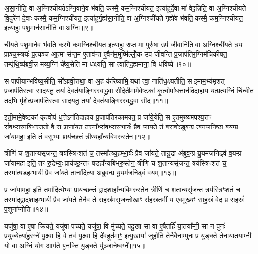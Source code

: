 अ॒सा॒नीति॒ वा अ॒ग्निश्ची॑यते\-ऽग्नि॒वाने॒व भ॑वति॒ कस्मै॒ कम॒ग्निश्ची॑यत॒ इत्या॑हुर्दे॒वा मा॑ वेद॒न्निति॒ वा अ॒ग्निश्ची॑यते वि॒दुरे॑नं दे॒वाः कस्मै॒ कम॒ग्निश्ची॑यत॒ इत्या॑हुर्गृ॒ह्य॑सा॒नीति॒ वा अ॒ग्निश्ची॑यते गृ॒ह्ये॑व भ॑वति॒ कस्मै॒ कम॒ग्निश्ची॑यत॒ इत्या॑हुः पशु॒मान॑सा॒नीति॒ वा अ॒ग्निः॥९॥

ची॒य॒ते॒ प॒शु॒माने॒व भ॑वति॒ कस्मै॒ कम॒ग्निश्ची॑यत॒ इत्या॑हुः स॒प्त मा॒ पुरु॑षा॒ उप॑ जीवा॒निति॒ वा अ॒ग्निश्ची॑यते॒ त्रयः॒ प्राञ्च॒स्त्रयः॑ प्र॒त्यञ्च॑ आ॒त्मा स॑प्त॒म ए॒ताव॑न्त ए॒वैन॑म॒मुष्मि॑ल्लोँ॒क उप॑ जीवन्ति प्र॒जाप॑तिर॒ग्निम॑चिकीषत॒ तम्पृ॑थि॒व्य॑ब्रवी॒न्न मय्य॒ग्निं चे᳚ष्य॒सेति॑ मा धक्ष्यति॒ सा त्वा॑तिद॒ह्यमा॑ना॒ वि ध॑विष्ये॥१०॥

स पापी॑यान्भविष्य॒सीति॒ सो᳚\-ऽब्रवी॒त्तथा॒ वा अ॒हं क॑रिष्यामि॒ यथा᳚ त्वा॒ नाति॑ध॒क्ष्यतीति॒ स इ॒माम॒भ्य॑मृशत् प्र॒जाप॑तिस्त्वा सादयतु॒ तया॑ दे॒वत॑याङ्गिर॒स्वद्ध्रु॒वा सी॒देती॒मामे॒वेष्ट॑कां कृ॒त्वोपा॑ध॒त्तान॑तिदाहाय॒ यत्प्रत्य॒ग्निं चि॑न्वी॒त तद॒भि मृ॑शेत्प्र॒जाप॑तिस्त्वा सादयतु॒ तया॑ दे॒वत॑याङ्गिर॒स्वद्ध्रु॒वा सी॑द॥११॥

इती॒मामे॒वेष्ट॑कां कृ॒त्वोप॑ ध॒त्ते\-ऽन॑तिदाहाय प्र॒जाप॑तिरकामयत॒ प्र जा॑ये॒येति॒ स ए॒तमुख्य॑मपश्य॒त्तꣳ सं॑वथ्स॒रम॑बिभ॒स्ततो॒ वै स प्राजा॑यत॒ तस्मा᳚थ्संवथ्स॒रम्भा॒र्यः॑ प्रैव जा॑यते॒ तं वस॑वो\-ऽब्रुव॒न्प्र त्वम॑जनिष्ठा व॒यम्प्र जा॑यामहा॒ इति॒ तं वसु॑भ्यः॒ प्राय॑च्छ॒त्तं त्रीण्यहा᳚न्यबिभरु॒स्तेन॑॥१२॥

त्रीणि॑ च श॒तान्यसृ॑जन्त॒ त्रय॑स्त्रिꣳशतं च॒ तस्मा᳚त्त्र्य॒हम्भा॒र्यः॑ प्रैव जा॑यते॒ तान्रु॒द्रा अ॑ब्रुव॒न्प्र यू॒यम॑जनिढ्वं व॒यम्प्र जा॑यामहा॒ इति॒ तꣳ रु॒द्रेभ्यः॒ प्राय॑च्छ॒न्तꣳ षडहा᳚न्यबिभरु॒स्तेन॒ त्रीणि॑ च श॒तान्यसृ॑जन्त॒ त्रय॑स्त्रिꣳशतं च॒ तस्मा᳚त्षड॒हम्भा॒र्यः॑ प्रैव जा॑यते॒ ताना॑दि॒त्या अ॑ब्रुव॒न्प्र यू॒यम॑जनिढ्वं व॒यम्॥१३॥

प्र जा॑यामहा॒ इति॒ तमा॑दि॒त्येभ्यः॒ प्राय॑च्छ॒न्तं द्वाद॒शाहा᳚न्यबिभरु॒स्तेन॒ त्रीणि॑ च श॒तान्यसृ॑जन्त॒ त्रय॑स्त्रिꣳशतं च॒ तस्मा᳚द्द्वादशा॒हम्भा॒र्यः॑ प्रैव जा॑यते॒ तेनै॒व ते स॒हस्र॑मसृजन्तो॒खाꣳ स॑हस्रत॒मीं य ए॒वमुख्यꣳ॑ साह॒स्रं वेद॒ प्र स॒हस्रं॑ प॒शूना᳚प्नोति॥१४॥

{\anuvakamend[{अ॒ग्नि॒वान्प॑शु॒मान॑सा॒नीति॒ वा अ॒ग्निर्ध॑विष्ये मृशेत्प्र॒जाप॑तिस्त्वा सादयतु॒ तया॑ दे॒वत॑याङ्गिर॒स्वद्ध्रु॒वा सी॑द॒ तेन॒ ताना॑दि॒त्या अ॑ब्रुव॒न्प्र यू॒यम॑जनिढ्वं व॒यञ्च॑त्वारि॒ꣳ॒शच्च॑॥२॥}]}

यजु॑षा॒ वा ए॒षा क्रि॑यते॒ यजु॑षा पच्यते॒ यजु॑षा॒ वि मु॑च्यते॒ यदु॒खा सा वा ए॒षैतर्\mbox{}हि॑ या॒तया᳚म्नी॒ सा न पुनः॑ प्र॒युज्येत्या॑हु॒रग्ने॑ यु॒क्ष्वा हि ये तव॑ यु॒क्ष्वा हि दे॑व॒हूत॑मा॒ꣳ॒ इत्यु॒खायां᳚ जुहोति॒ तेनै॒वैना॒म्पुनः॒ प्र यु॑ङ्क्ते॒ तेनाया॑तयाम्नी॒ यो वा अ॒ग्निं योग॒ आग॑ते यु॒नक्ति॑ यु॒ङ्क्ते यु॑ञ्जा॒नेष्वग्ने᳚॥१५॥

